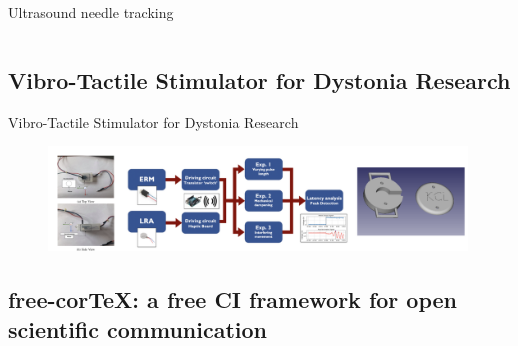 {\begin{frame}{Ultrasound needle tracking}
\begin{columns}
\end{columns}

\end{frame}
}



\subsection{Vibro-Tactile Stimulator for Dystonia Research}

{
\begin{frame}{Vibro-Tactile Stimulator for Dystonia Research}

      \begin{figure}
        \centering
        \includegraphics[width=0.99\textwidth]{./figs/event-detection/versions/drawing-v00.png}
      \end{figure}

\end{frame}
}




\subsection{free-corTeX: a free CI framework for open scientific communication}

